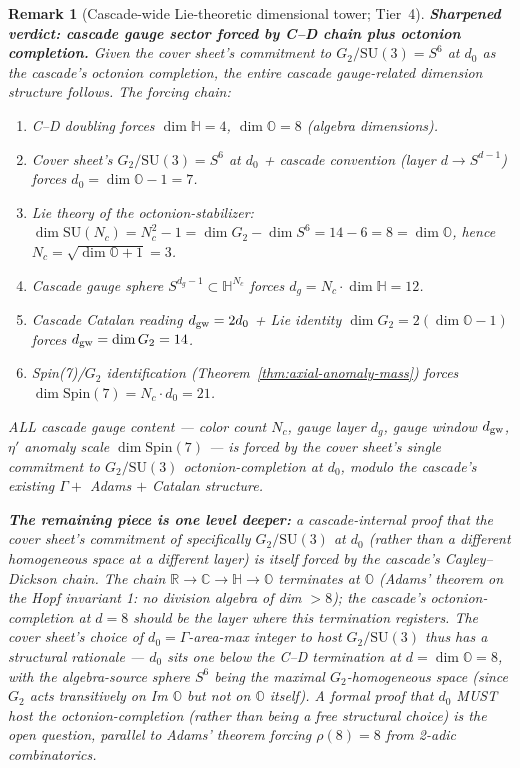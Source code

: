 \documentclass[12pt,a4paper]{article}
\newtheorem*{remark}{Remark}
\begin{document}
\begin{remark}[Cascade-wide Lie-theoretic dimensional tower; Tier~4]
\medskip\noindent\textbf{Sharpened verdict: cascade gauge sector forced by C--D chain plus octonion completion.} Given the cover sheet's commitment to $G_2/\mathrm{SU}(3) = S^6$ at $d_0$ as the cascade's octonion completion, the entire cascade gauge-related dimension structure follows. The forcing chain:
\begin{enumerate}[nosep,label=(\arabic*)]
\item C--D doubling forces $\dim\mathbb{H} = 4$, $\dim\mathbb{O} = 8$ (algebra dimensions).
\item Cover sheet's $G_2/\mathrm{SU}(3) = S^6$ at $d_0$ + cascade convention (layer $d \to S^{d-1}$) forces $d_0 = \dim\mathbb{O} - 1 = 7$.
\item Lie theory of the octonion-stabilizer: $\dim\mathrm{SU}(N_c) = N_c^2 - 1 = \dim G_2 - \dim S^6 = 14 - 6 = 8 = \dim\mathbb{O}$, hence $N_c = \sqrt{\dim\mathbb{O} + 1} = 3$.
\item Cascade gauge sphere $S^{d_g - 1} \subset \mathbb{H}^{N_c}$ forces $d_g = N_c \cdot \dim\mathbb{H} = 12$.
\item Cascade Catalan reading $d_{\rm gw} = 2 d_0$ + Lie identity $\dim G_2 = 2(\dim\mathbb{O} - 1)$ forces $d_{\rm gw} = \dim G_2 = 14$.
\item Spin(7)/$G_2$ identification (Theorem~\ref{thm:axial-anomaly-mass}) forces $\dim\mathrm{Spin}(7) = N_c \cdot d_0 = 21$.
\end{enumerate}
ALL cascade gauge content --- color count $N_c$, gauge layer $d_g$, gauge window $d_{\rm gw}$, $\eta'$ anomaly scale $\dim\mathrm{Spin}(7)$ --- is forced by the cover sheet's single commitment to $G_2/\mathrm{SU}(3)$ octonion-completion at $d_0$, modulo the cascade's existing $\Gamma + $ Adams $+ $ Catalan structure.

\medskip\noindent\textbf{The remaining piece is one level deeper:} a cascade-internal proof that the cover sheet's commitment of \emph{specifically} $G_2/\mathrm{SU}(3)$ at $d_0$ (rather than a different homogeneous space at a different layer) is itself forced by the cascade's Cayley--Dickson chain. The chain $\mathbb{R}\to\mathbb{C}\to\mathbb{H}\to\mathbb{O}$ terminates at $\mathbb{O}$ (Adams' theorem on the Hopf invariant 1: no division algebra of dim $> 8$); the cascade's octonion-completion at $d=8$ should be the layer where this termination registers. The cover sheet's choice of $d_0 = \Gamma$-area-max integer to host $G_2/\mathrm{SU}(3)$ thus has a structural rationale --- $d_0$ sits one below the C--D termination at $d = \dim\mathbb{O} = 8$, with the algebra-source sphere $S^6$ being the maximal $G_2$-homogeneous space (since $G_2$ acts transitively on Im $\mathbb{O}$ but not on $\mathbb{O}$ itself). A formal proof that $d_0$ MUST host the octonion-completion (rather than being a free structural choice) is the open question, parallel to Adams' theorem forcing $\rho(8) = 8$ from 2-adic combinatorics.


\end{remark}
\end{document}
